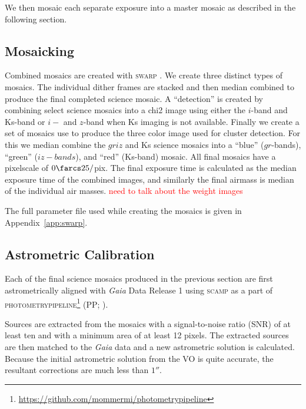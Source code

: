 \documentclass[apj, revtex4]{emulateapj}
\newcommand{\editorial}[1]{\textcolor{red}{#1}}
\begin{document}
We then mosaic each separate exposure into a master mosaic as described in the following section.

\subsection{Mosaicking}\label{sec:mosaicks}
Combined mosaics are created with \textsc{swarp} \citep{Bertin2002}. We create three distinct types of mosaics. The individual dither frames are stacked and then median combined to produce the final completed science mosaic. A ``detection'' is created by combining select science mosaics into a chi2 image using either the $i$-band and Ks-band or $i-$ and $z$-band when Ks imaging is not available. Finally we create a set of mosaics use to produce the three color image used for cluster detection. For this we median combine the $griz$ and Ks science mosaics into a ``blue'' ($gr$-bands), ``green'' ($iz-bands$), and ``red'' (Ks-band) mosaic. All final mosaics have a pixelscale of $0\farcs25/$pix. The final exposure time is calculated as the median exposure time of the combined images, and similarly the final airmass is median of the individual air masses. \editorial{need to talk about the weight images}

The full parameter file used while creating the mosaics is given in Appendix~\ref{app:swarp}.

\subsection{Astrometric Calibration}
Each of the final science mosaics produced in the previous section are first astrometrically aligned with \textit{Gaia} \citep{GaiaCollaboration2016} Data Release 1 \citep{GaiaCollaboration2016a} using \textsc{scamp} \citep{Bertin2006} as a part of \textsc{photometrypipeline}\footnote{\url{https://github.com/mommermi/photometrypipeline}} (PP; \citealt{Mommert2017}).

Sources are extracted from the mosaics with a signal-to-noise ratio (SNR) of at least ten and with a minimum area of at least 12 pixels. The extracted sources are then matched to the \textit{Gaia} data and a new astrometric solution is calculated. Because the initial astrometric solution from the VO is quite accurate, the resultant corrections are much less than $1''$.
\end{document}
